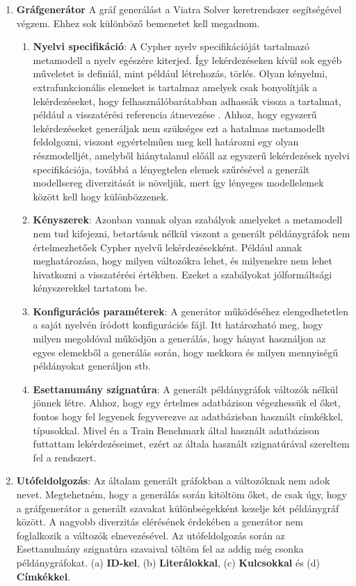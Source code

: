 \begin{enumerate}
	\item \textbf{Gráfgenerátor}
	A gráf generálást a Viatra Solver keretrendszer  segítségével végzem. Ehhez sok különböző bemenetet kell megadnom. 
	\begin{enumerate}
		\item\textbf{Nyelvi specifikáció}: A Cypher nyelv specifikációját tartalmazó metamodell a nyelv egészére kiterjed. Így lekérdezéseken kívül sok egyéb műveletet is definiál, mint például létrehozás, törlés. Olyan kényelmi, extrafunkcionális elemeket is tartalmaz amelyek csak bonyolítják a lekérdezéseket, hogy felhasználóbarátabban adhassák vissza a tartalmat, például a visszatérési referencia átnevezése . Ahhoz, hogy egyszerű lekérdezéseket generáljak nem szükséges ezt a hatalmas metamodellt feldolgozni, viszont egyértelműen meg kell határozni egy olyan részmodelljét, amelyből hiánytalanul előáll az egyszerű lekérdezések nyelvi specifikációja, továbbá a lényegtelen elemek szűrésével a generált modellsereg diverzitását is növeljük, mert így lényeges modellelemek között kell hogy különbözzenek. 
		\item\textbf{Kényszerek}: Azonban vannak	olyan szabályok amelyeket a metamodell nem tud kifejezni, betartásuk nélkül viszont a generált példánygráfok nem értelmezhetőek Cypher nyelvű lekérdezésekként. Például annak meghatározása, hogy milyen változókra lehet, és milyenekre nem lehet hivatkozni a visszatérési értékben. Ezeket a szabályokat jólformáltsági kényszerekkel tartatom be. 
		\item\textbf{Konfigurációs paraméterek}: A generátor működéséhez elengedhetetlen a saját nyelvén íródott konfigurációs fájl. Itt határozható meg, hogy milyen megoldóval működjön a generálás, hogy hányat használjon az egyes elemekből a generálás során, hogy mekkora és milyen mennyiségű példányokat generáljon stb.  
		\item\textbf{Esettanumány szignatúra}: A generált példánygráfok változók nélkül jönnek létre. Ahhoz, hogy egy értelmes adatbázison végezhessük el őket, fontos hogy fel legyenek fegyverezve az adatbázisban használt címkékkel, típusokkal. Mivel én a Train Benchmark által használt adatbázison futtattam lekérdezéseimet, ezért az általa használt szignatúrával szereltem fel a rendszert. 
	\end{enumerate}
	\item \textbf{Utófeldolgozás}: Az általam generált gráfokban a változóknak nem adok nevet. Megtehetném, hogy a generálás során kitöltöm őket, de csak úgy, hogy a gráfgenerátor a generált szavakat különbségekként kezelje két példánygráf között. A nagyobb diverzitás elérésének érdekében a generátor nem foglalkozik a változók elnevezésével. Az utófeldolgozás során az Esettanulmány szignatúra szavaival töltöm fel az addig még csonka példánygráfokat. (a) \textbf{ID-kel}, (b) \textbf{Literálokkal}, (c) \textbf{Kulcsokkal} és (d) \textbf{Címkékkel}.   

\end{enumerate}
